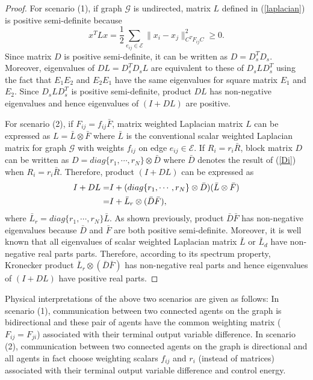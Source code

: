 \documentclass[10pt,doublecolumn]{IEEEtran}  %
\begin{document}
\begin{proof}
For scenario (1), if graph $\mathcal{G}$ is undirected, matrix $L$ defined in (\ref{laplacian}) is positive semi-definite because
\[x^TLx =\frac{1}{2}\sum_{e_{ij}\in\mathcal{E}}\|x_i-x_j\|^2_{C^TF_{ij}C}\geq 0.\]
Since matrix $D$ is positive semi-definite, it can be written as $D=D^T_sD_s$. Moreover, eigenvalues of $DL=D_s^TD_sL$ are equivalent to these of $D_sLD_s^T$ using the fact that $E_1E_2$ and $E_2E_1$ have the same eigenvalues for square matrix $E_1$ and $E_2$. Since $D_sLD_s^T$ is positive semi-definite, product $DL$ has non-negative eigenvalues and hence eigenvalues of $(I+DL)$ are positive. 

For scenario (2), if $F_{ij}=f_{ij}\bar{F}$, matrix weighted Laplacian matrix $L$ can be expressed as $L=\bar{L}\otimes \bar{F}$ where $\bar{L}$ is the conventional scalar weighted Laplacian matrix for graph $\mathcal{G}$ with weights $f_{ij}$ on edge $e_{ij}\in\mathcal{E}$. If $R_i=r_i\bar{R}$, block matrix $D$ can be written as $D=diag\{r_1,\cdots,r_N\}\otimes \bar{D}$ where $\bar{D}$ denotes the result of (\ref{Di}) when $R_i=r_i\bar{R}$. Therefore, product $(I+DL)$ can be expressed as
\begin{align}
I+DL=&I+(diag\{r_1,\cdots,r_N\}\otimes \bar{D})(\bar{L}\otimes \bar{F})\notag\\
=&I+\bar{L}_r\otimes(\bar{D}\bar{F})\notag,
\end{align}
where $\bar{L}_r=diag\{r_1,\cdots,r_N\}\bar{L}$. As shown previously, product $\bar{D}\bar{F}$ has non-negative eigenvalues because $\bar{D}$ and $\bar{F}$ are both positive semi-definite. Moreover, it is well known that all eigenvalues of scalar weighted Laplacian matrix $\bar{L}$ or $\bar{L}_d$ have non-negative real parts parts. Therefore, according to its spectrum property, Kronecker product $\bar{L}_r\otimes(\bar{D}\bar{F})$ has non-negative real parts and hence eigenvalues of $(I+DL)$ have positive real parts.
\end{proof}

Physical interpretations of the above two scenarios are given as follows: In scenario (1), communication between two connected agents on the graph is bidirectional and these pair of agents have the common weighting matrix ($F_{ij}=F_{ji}$) associated with their terminal output variable difference. In scenario (2), communication between two connected agents on the graph is directional and all agents in fact choose weighting scalars $f_{ij}$ and $r_i$ (instead of matrices) associated with their terminal output variable difference and control energy. 
\end{document}
